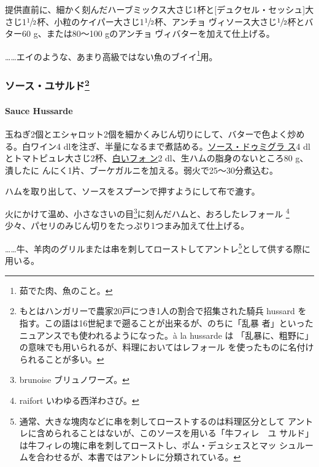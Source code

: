 提供直前に、細かく刻んだハーブミックス大さじ1杯と{[}デュクセル・セッシュ{]}大
さじ1\(\sfrac{1}{2}\)杯、小粒のケイパー大さじ1\(\sfrac{1}{2}\)杯、アンチョ
ヴィソース大さじ\(\sfrac{1}{2}\)杯とバター60 g、または80〜100
gのアンチョ ヴィバターを加えて仕上げる。

\ldots{}\ldots{}エイのような、あまり高級ではない魚のブイイ\footnote{茹でた肉、魚のこと。}用。

\maeaki

\hypertarget{ux30bdux30fcux30b9ux30e6ux30b5ux30ebux30c951}{%
\subsubsection[ソース・ユサルド]{\texorpdfstring{ソース・ユサルド\footnote{もとはハンガリーで農家20戸につき1人の割合で招集された騎兵
  hussard を指す。この語は16世紀まで遡ることが出来るが、のちに「乱暴
  者」といったニュアンスでも使われるようになった。à la hussarde は
  「乱暴に、粗野に」の意味でも用いられるが、料理においてはレフォール
  を使ったものに名付けられることが多い。}}{ソース・ユサルド}}\label{ux30bdux30fcux30b9ux30e6ux30b5ux30ebux30c951}}

\hypertarget{sauce-hussarde}{%
\paragraph{Sauce Hussarde}\label{sauce-hussarde}}


玉ねぎ2個とエシャロット2個を細かくみじん切りにして、バターで色よく炒め
る。白ワイン4
dlを注ぎ、半量になるまで煮詰める。\protect\hyperlink{sauce-demi-glace}{ソース・ドゥミグラ
ス}4
dlとトマトピュレ大さじ2杯、\protect\hyperlink{fonds-blanc-ordinaire}{白いフォ
ン}2 dl、生ハムの脂身のないところ80 g、潰したに
んにく1片、ブーケガルニを加える。弱火で25〜30分煮込む。

ハムを取り出して、ソースをスプーンで押すようにして布で漉す。

火にかけて温め、小さなさいの目\footnote{brunoise ブリュノワーズ。}に刻んだハムと、おろしたレフォール
\footnote{raifort いわゆる西洋わさび。}少々、パセリのみじん切りをたっぷり1つまみ加えて仕上げる。

\ldots{}\ldots{}牛、羊肉のグリルまたは串を刺してローストしてアントレ\footnote{通常、大きな塊肉などに串を刺してローストするのは料理区分として
  アントレに含められることはないが、このソースを用いる「牛フィレ　ユ
  サルド」は牛フィレの塊に串を刺してローストし、ポム・デュシェスとマッ
  シュルームを合わせるが、本書ではアントレに分類されている。}として供する際に用いる。

